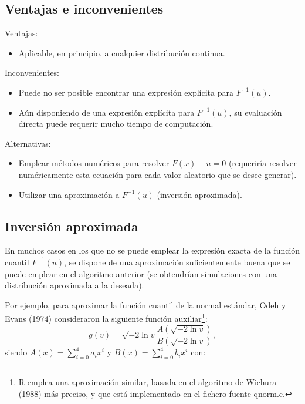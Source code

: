 \documentclass[
]{book}
\providecommand{\tightlist}{%
  \setlength{\itemsep}{0pt}\setlength{\parskip}{0pt}}
\theoremstyle{break}
\theoremstyle{definition}
\theoremstyle{definition}
\theoremstyle{definition}
\theoremstyle{remark}
\begin{document}
\hypertarget{ventajas-e-inconvenientes}{%
\subsection{Ventajas e inconvenientes}\label{ventajas-e-inconvenientes}}

Ventajas:

\begin{itemize}
\tightlist
\item
  Aplicable, en principio, a cualquier distribución continua.
\end{itemize}

Inconvenientes:

\begin{itemize}
\item
  Puede no ser posible encontrar una expresión explícita para
  \(F^{-1}\left( u\right).\)
\item
  Aún disponiendo de una expresión explícita para
  \(F^{-1}\left( u\right)\), su evaluación directa puede requerir
  mucho tiempo de computación.
\end{itemize}

Alternativas:

\begin{itemize}
\item
  Emplear métodos numéricos para resolver \(F(x) - u=0\)
  (requeriría resolver numéricamente esta ecuación para cada
  valor aleatorio que se desee generar).
\item
  Utilizar una aproximación a \(F^{-1}\left( u\right)\)
  (inversión aproximada).
\end{itemize}

\hypertarget{inversiuxf3n-aproximada}{%
\subsection{Inversión aproximada}\label{inversiuxf3n-aproximada}}

En muchos casos en los que no se puede emplear la expresión exacta de la función
cuantil \(F^{-1}\left( u\right)\), se dispone de una aproximación suficientemente
buena que se puede emplear en el algoritmo anterior (se obtendrían simulaciones
con una distribución aproximada a la deseada).

Por ejemplo, para aproximar la función cuantil de la normal estándar,
Odeh y Evans (1974) consideraron la siguiente función auxiliar\footnote{R emplea una aproximación similar, basada en el algoritmo de Wichura (1988) más preciso, y que está implementado en el fichero fuente \href{https://svn.r-project.org/R/trunk/src/nmath/qnorm.c}{qnorm.c}.}:
\[ g\left( v\right)  =\sqrt{-2\ln v}\frac{A\left( \sqrt{-2\ln v}\right)
}{B\left( \sqrt{-2\ln v}\right)  },\]
siendo \(A(x) =\sum_{i=0}^{4}a_{i}x^{i}\)
y \(B(x) =\sum_{i=0}^{4}b_{i}x^{i}\) con:
\end{document}
